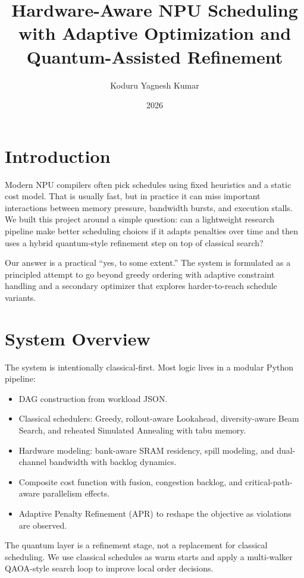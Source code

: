 \documentclass[11pt]{article}
\title{Hardware-Aware NPU Scheduling with Adaptive Optimization and Quantum-Assisted Refinement}
\author{Koduru Yagnesh Kumar}
\date{2026}
\begin{document}
\maketitle

\section{Introduction}
Modern NPU compilers often pick schedules using fixed heuristics and a static cost model. That is usually fast, but in practice it can miss important interactions between memory pressure, bandwidth bursts, and execution stalls. We built this project around a simple question: can a lightweight research pipeline make better scheduling choices if it adapts penalties over time and then uses a hybrid quantum-style refinement step on top of classical search?

Our answer is a practical ``yes, to some extent.'' The system is formulated as a principled attempt to go beyond greedy ordering with adaptive constraint handling and a secondary optimizer that explores harder-to-reach schedule variants.

\section{System Overview}
The system is intentionally classical-first. Most logic lives in a modular Python pipeline:
\begin{itemize}
    \item DAG construction from workload JSON.
    \item Classical schedulers: Greedy, rollout-aware Lookahead, diversity-aware Beam Search, and reheated Simulated Annealing with tabu memory.
    \item Hardware modeling: bank-aware SRAM residency, spill modeling, and dual-channel bandwidth with backlog dynamics.
    \item Composite cost function with fusion, congestion backlog, and critical-path-aware parallelism effects.
    \item Adaptive Penalty Refinement (APR) to reshape the objective as violations are observed.
\end{itemize}

The quantum layer is a refinement stage, not a replacement for classical scheduling. We use classical schedules as warm starts and apply a multi-walker QAOA-style search loop to improve local order decisions.
\end{document}
